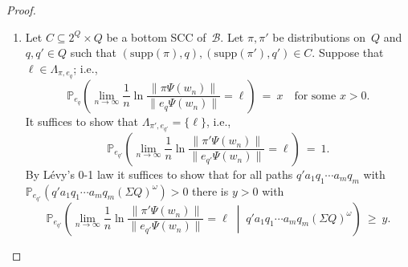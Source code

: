 \documentclass[a4paper,UKenglish,cleveref, autoref,mathscr]{lipics-v2019}
\newcommand{\PP}{\mathbb{P}}
\newcommand{\1}{\mathbbm{1}}
\newcommand{\supp}{\mathrm{supp}}
\newcommand{\B}{\mathcal{B}}
\begin{document}
\lemexpoprop*
\begin{proof}
\begin{enumerate}
\item
Let $C \subseteq 2^Q \times Q$ be a bottom SCC of~$\B$.
Let $\pi, \pi'$ be distributions on~$Q$ and $q, q' \in Q$ such that $(\supp(\pi),q), (\supp(\pi'),q') \in C$.
Suppose that $\ell \in \Lambda_{\pi,e_{q}}$; i.e.,
\begin{equation} \label{eq:expoprop-ass}
 \PP_{e_{q}}\left(\lim_{n \to \infty} \frac1n \ln \frac{\| \pi \Psi(w_n) \|}{\| e_q \Psi(w_n) \|} = \ell\right) \ = \ x \quad \text{for some } x>0.
\end{equation}
It suffices to show that $\Lambda_{\pi',e_{q'}} = \{\ell\}$, i.e.,
\[
 \PP_{e_{q'}}\left(\lim_{n \to \infty} \frac1n \ln \frac{\| \pi' \Psi(w_n) \|}{\| e_{q'} \Psi(w_n) \|} = \ell\right) \ = \ 1.
\]
By L\'evy's 0-1 law it suffices to show that for all paths $q' a_1 q_1 \cdots a_m q_m$ with $\PP_{e_{q'}}(q' a_1 q_1 \cdots a_m q_m(\Sigma Q)^\omega) > 0$ there is $y>0$ with
\begin{equation} \label{eq:expoprop-goal}
 \PP_{e_{q'}}\left(\lim_{n \to \infty} \frac1n \ln \frac{\| \pi' \Psi(w_n) \|}{\| e_{q'} \Psi(w_n) \|} = \ell \;\middle\vert\; q' a_1 q_1 \cdots a_m q_m (\Sigma Q)^\omega \right) \ \ge \ y.
\end{equation}


\end{enumerate}
\end{proof}
\end{document}
